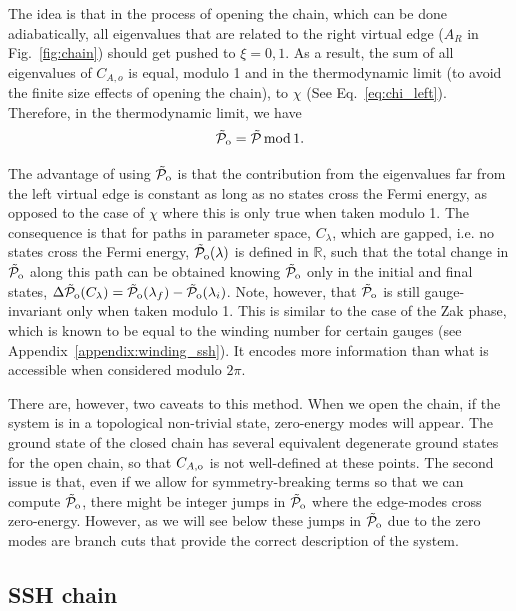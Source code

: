 \documentclass[twocolumn,amsmath,longbibliography,amssymb,superscriptaddress]{revtex4-1}
\newcommand{\tpo}{\tilde{\mathcal{P}}_{\rm o}}
\begin{document}
The idea is that in the process of opening the chain, which can be done adiabatically, all eigenvalues that are related to the right virtual edge ($A_R$ in Fig.~\ref{fig:chain}) should get pushed to $\xi=0,1$. As a result, the sum of all eigenvalues of $C_{A,o}$ is equal, modulo 1 and in the thermodynamic limit (to avoid the finite size effects of opening the chain), to $\chi$ (See Eq.~\eqref{eq:chi_left}). Therefore, in the thermodynamic limit, we have
\begin{equation}
\tpo = \tilde{\mathcal{P}} \, {\rm mod} \, 1.
\end{equation}


The advantage of using $\tpo$ is that the contribution from the eigenvalues far from the left virtual edge is constant as long as no states cross the Fermi energy, as opposed to the case of $\chi$ where this is only true when taken modulo 1. The consequence is that for paths in parameter space, $C_\lambda$, which are gapped, i.e. no states cross the Fermi energy, $\tpo (\lambda)$ is defined in $\mathbb{R}$, such that the total change in $\tpo$ along this path can be obtained knowing $\tpo$ only in the initial and final states, $\Delta \tpo ({C_\lambda}) = \tpo(\lambda_f) - \tpo(\lambda_i)$. Note, however, that $\tpo$ is still gauge-invariant only when taken modulo 1. This is similar to the case of the Zak phase, which is known to be equal to the winding number for certain gauges (see Appendix~\ref{appendix:winding_ssh}). It encodes more information than what is accessible when considered modulo $2\pi$.

There are, however, two caveats to this method. When we open the chain, if the system is in a topological non-trivial state, zero-energy modes will appear. The ground state of the closed chain has several equivalent degenerate ground states for the open chain, so that $C_{A,\rm o}$ is not well-defined at these points. The second issue is that, even if we allow for symmetry-breaking terms so that we can compute $\tpo$, there might be integer jumps in $\tpo$ where the edge-modes cross zero-energy. However, as we will see below these jumps in $\tpo$ due to the zero modes are branch cuts that provide the correct description of the system. 


\subsection{SSH chain}
\end{document}
